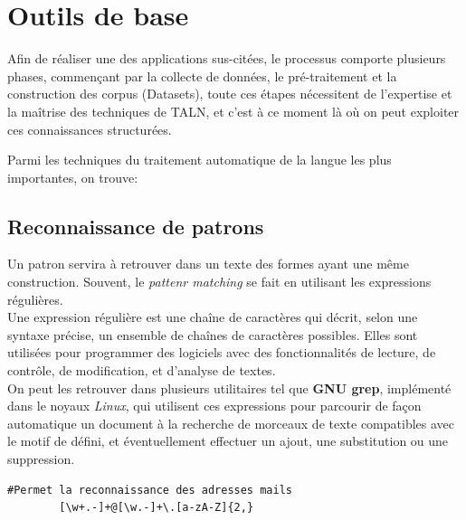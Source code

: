    
\section{Outils de base}
Afin de réaliser une des applications sus-citées, le processus comporte plusieurs phases, commençant par la collecte de données, le pré-traitement et la construction des corpus (Datasets), toute ces étapes nécessitent de l'expertise et la maîtrise des techniques de TALN, et c'est à ce moment là où on peut exploiter ces connaissances structurées.

Parmi les techniques du traitement automatique de la langue les plus importantes, on trouve:
    \subsection{Reconnaissance de patrons}
    Un patron servira à retrouver dans un texte des formes ayant une même construction. Souvent, le \emph{pattenr matching} se fait en utilisant les expressions régulières.\\ 
    Une expression régulière est une chaîne de caractères qui décrit, selon une syntaxe précise, un ensemble de chaînes de caractères possibles. Elles sont utilisées pour programmer des logiciels avec des fonctionnalités de lecture, de contrôle, de modification, et d'analyse de textes.\\
    On peut les retrouver dans plusieurs utilitaires tel que \textbf{GNU grep}, implémenté dans le noyaux \emph{Linux}, qui utilisent ces expressions pour parcourir de façon automatique un document à la recherche de morceaux de texte compatibles avec le motif de défini, et éventuellement effectuer un ajout, une substitution ou une suppression.
    \begin{lstlisting}[style=code]
        #Permet la reconnaissance des adresses mails
        [\w+.-]+@[\w.-]+\.[a-zA-Z]{2,}
    \end{lstlisting}

